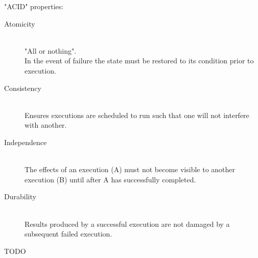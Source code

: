 \documentclass[a4paper]{article}
\begin{document}
"ACID" properties:

\begin{description}
  \item[Atomicity] \hfill \\
    "All or nothing". \\
    In the event of failure the state must be restored to its condition prior to
    execution.
  \item[Consistency] \hfill \\
    Ensures executions are scheduled to run such that one will not interfere
    with another.
  \item[Independence] \hfill \\
    The effects of an execution (A) must not become visible to another execution
    (B) until after A has successfully completed.
  \item[Durability] \hfill \\
    Results produced by a successful execution are not damaged by a subsequent
    failed execution.
\end{description}

TODO
\end{document}
